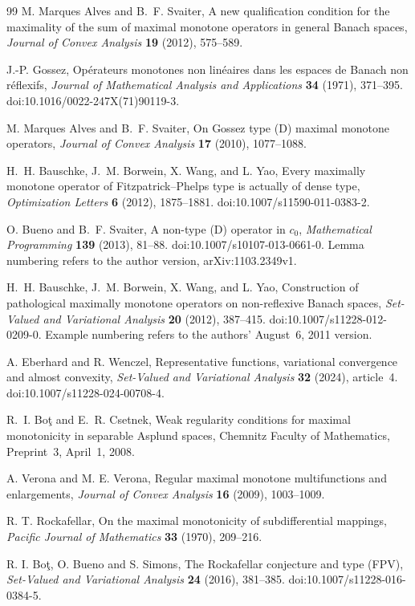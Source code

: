 \begin{thebibliography}{99}
M. Marques Alves and B.~F. Svaiter,
A new qualification condition for the maximality of the sum of maximal
monotone operators in general Banach spaces,
\emph{Journal of Convex Analysis} \textbf{19} (2012), 575--589.

J.-P. Gossez,
Op\'{e}rateurs monotones non lin\'{e}aires dans les espaces de Banach non r\'{e}flexifs,
\emph{Journal of Mathematical Analysis and Applications}
\textbf{34} (1971), 371--395.
doi:10.1016/0022-247X(71)90119-3.

M. Marques Alves and B.~F. Svaiter,
On Gossez type (D) maximal monotone operators,
\emph{Journal of Convex Analysis} \textbf{17} (2010), 1077--1088.

H.~H. Bauschke, J.~M. Borwein, X. Wang, and L. Yao,
Every maximally monotone operator of Fitzpatrick--Phelps type is actually
of dense type,
\emph{Optimization Letters} \textbf{6} (2012), 1875--1881.
doi:10.1007/s11590-011-0383-2.

O. Bueno and B.~F. Svaiter,
A non-type (D) operator in $c_0$,
\emph{Mathematical Programming} \textbf{139} (2013), 81--88.
doi:10.1007/s10107-013-0661-0.
Lemma numbering refers to the author version, arXiv:1103.2349v1.

H.~H. Bauschke, J.~M. Borwein, X. Wang, and L. Yao,
Construction of pathological maximally monotone operators on
non-reflexive Banach spaces,
\emph{Set-Valued and Variational Analysis} \textbf{20} (2012), 387--415.
doi:10.1007/s11228-012-0209-0.
Example numbering refers to the authors' August~6, 2011 version.

A. Eberhard and R. Wenczel,
Representative functions, variational convergence and almost convexity,
\emph{Set-Valued and Variational Analysis} \textbf{32} (2024), article~4.
doi:10.1007/s11228-024-00708-4.

R.~I. Bo\c{t} and E.~R. Csetnek,
Weak regularity conditions for maximal monotonicity in separable
Asplund spaces,
Chemnitz Faculty of Mathematics, Preprint~3, April~1, 2008.

A. Verona and M. E. Verona,
Regular maximal monotone multifunctions and enlargements,
\emph{Journal of Convex Analysis} \textbf{16} (2009), 1003--1009.

R. T. Rockafellar,
On the maximal monotonicity of subdifferential mappings,
\emph{Pacific Journal of Mathematics} \textbf{33} (1970), 209--216.

R. I. Bo\c{t}, O. Bueno and S. Simons,
The Rockafellar conjecture and type (FPV),
\emph{Set-Valued and Variational Analysis} \textbf{24} (2016), 381--385.
doi:10.1007/s11228-016-0384-5.

\end{thebibliography}


